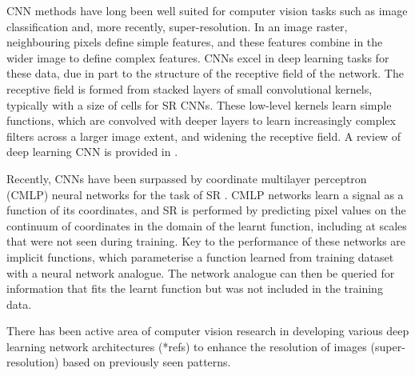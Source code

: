 \documentclass[manuscript.tex]{subfiles}
\begin{document}
CNN methods have long been well suited for computer vision tasks such as image classification and, more recently, super-resolution.
In an image raster, neighbouring pixels define simple features, and these features combine in the wider image to define complex features.
CNNs excel in deep learning tasks for these data, due in part to the structure of the receptive field of the network.
The receptive field is formed from stacked layers of small convolutional kernels, typically with a size of  cells for SR CNNs.
These low-level kernels learn simple functions, which are convolved with deeper layers to learn increasingly complex filters across a larger image extent, and widening the receptive field.
A review of deep learning CNN is provided in \textcite{goodfellowDeepLearning2016}.

Recently, CNNs have been surpassed by coordinate multilayer perceptron (CMLP) neural networks for the task of SR \parencite{chenLearningContinuousImage2021}.
CMLP networks learn a signal as a function of its coordinates, and SR is performed by predicting pixel values on the continuum of coordinates in the domain of the learnt function, including at scales that were not seen during training.
Key to the performance of these networks are implicit functions, which parameterise a function learned from training dataset with a neural network analogue.
The network analogue can then be queried for information that fits the learnt function but was not included in the training data.




There has been active area of computer vision research in developing various deep learning network architectures (*refs) to enhance the resolution of images (super-resolution) based on previously seen patterns.
\end{document}
